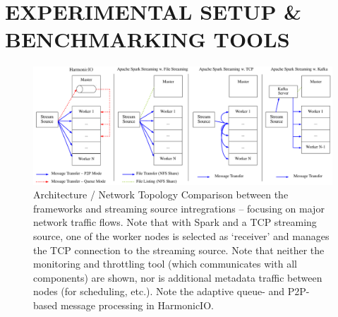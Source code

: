 \documentclass[conference]{IEEEtran}
\begin{document}






\section{EXPERIMENTAL SETUP \& BENCHMARKING TOOLS}\label{expsetup}

\begin{figure}[h]
\includegraphics[width=\textwidth]{images/arch-comp-w-kafka}
\caption{Architecture / Network Topology Comparison between the frameworks and streaming source intregrations -- focusing on major network traffic flows. Note that with Spark and a TCP streaming source, one of the worker nodes is selected as `receiver' and manages the TCP connection to the streaming source. 
Note that neither the monitoring and throttling tool (which communicates with all components) are shown, nor is additional metadata traffic between nodes (for scheduling, etc.). Note the adaptive queue- and P2P-based message processing in HarmonicIO.}
\label{fig:arch-comp}
\end{figure}
\end{document}
